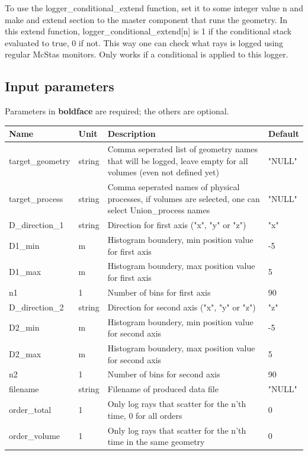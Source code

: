 To use the logger\_conditional\_extend function, set it to some integer value n and make and extend section to the master component that runs the geometry. In this extend function, logger\_conditional\_extend[n] is 1 if the conditional stack evaluated to true, 0 if not. This way one can check what rays is logged using regular McStas monitors. Only works if a conditional is applied to this logger.

\subsection*{Input parameters}
Parameters in \textbf{boldface} are required; the others are optional.

\begin{longtable}{p{}p{}p{}p{}}
\toprule
\textbf{Name} & \textbf{Unit} & \textbf{Description} & \textbf{Default} \\
\midrule
\endhead
target\_geometry & string & Comma seperated list of geometry names that will be logged, leave empty for all volumes (even not defined yet) & "NULL" \\
target\_process & string & Comma seperated names of physical processes, if volumes are selected, one can select Union\_process names & "NULL" \\
D\_direction\_1 & string & Direction for first axis ("x", "y" or "z") & "x" \\
D1\_min & m & Histogram boundery, min position value for first axis & -5 \\
D1\_max & m & Histogram boundery, max position value for first axis & 5 \\
n1 & 1 & Number of bins for first axis & 90 \\
D\_direction\_2 & string & Direction for second axis ("x", "y" or "z") & "z" \\
D2\_min & m & Histogram boundery, min position value for second axis & -5 \\
D2\_max & m & Histogram boundery, max position value for second axis & 5 \\
n2 & 1 & Number of bins for second axis & 90 \\
filename & string & Filename of produced data file & "NULL" \\
order\_total & 1 & Only log rays that scatter for the n'th time, 0 for all orders & 0 \\
order\_volume & 1 & Only log rays that scatter for the n'th time in the same geometry & 0 \\

\end{longtable}
